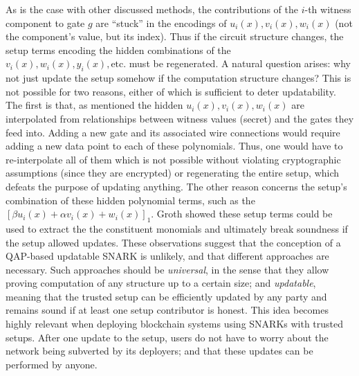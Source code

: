 \noindent As is the case with other discussed methods, the contributions of the $i$-th witness component to gate $g$ are ``stuck'' in the encodings of $u_i(x), v_i(x), w_i(x)$ (not the component's value, but its index). Thus if the circuit structure changes, the setup terms encoding the hidden combinations of the $v_i(x), w_i(x), y_i(x), \text{etc.}$ must be regenerated. A natural question arises: why not just update the setup somehow if the computation structure changes? This is not possible for two reasons, either of which is sufficient to deter updatability. The first is that, as mentioned the hidden $u_i(x), v_i(x), w_i(x)$ are interpolated from relationships between witness values (secret) and the gates they feed into. Adding a new gate and its associated wire connections would require adding a new data point to each of these polynomials. Thus, one would have to re-interpolate all of them which is not possible without violating cryptographic assumptions (since they are encrypted) or regenerating the entire setup, which defeats the purpose of updating anything. The other reason concerns the setup's combination of these hidden polynomial terms, such as the $[\beta u_i(x) + \alpha v_i(x) + w_i(x)]_1$. Groth \cite{grothupdatable} showed these setup terms could be used to extract the the constituent monomials and ultimately break soundness if the setup allowed updates. These observations suggest that the conception of a QAP-based updatable SNARK is unlikely, and that different approaches are necessary. Such approaches should be \textit{universal}, in the sense that they allow proving computation of any structure up to a certain size; and \textit{updatable}, meaning that the trusted setup can be efficiently updated by any party and remains sound if at least one setup contributor is honest. This idea becomes highly relevant when deploying blockchain systems using SNARKs with trusted setups. After one update to the setup, users do not have to worry about the network being subverted by its deployers; and that these updates can be performed by anyone.\\

